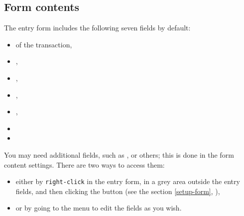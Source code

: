 \subsection{Form contents\label{transactions-form-content}}

The entry form includes the following seven fields by default:
\begin{itemize}
	\item {} of the transaction,
	\item {},
	\item {},
	\item {},
	\item {},
	\item {}
	\item {}
\end{itemize}
You may need additional fields, such as ,  or others; this is done in the form content settings. There are two ways to access them:
\begin{itemize}
	\item either by \texttt{right-click} in the entry form, in a grey area outside the entry fields, and then clicking the  button (see the section \vref{setup-form}, ),
	\item or by going to the  menu to edit the fields as you wish.
\end{itemize}
